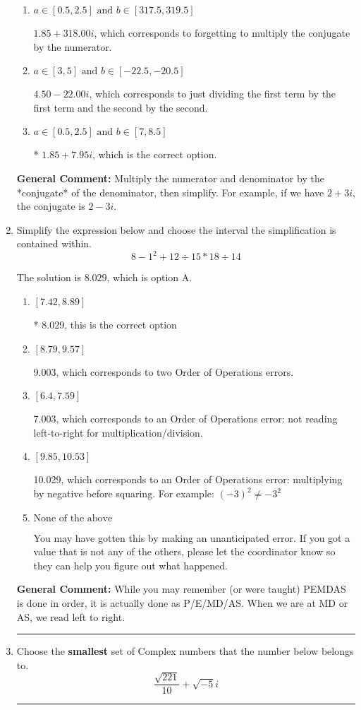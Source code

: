 \documentclass{extbook}[14pt]
\newcommand{\litem}[1]{\item #1

\rule{\textwidth}{0.4pt}}
\begin{document}
\begin{enumerate}
{\begin{enumerate}[label=\Alph*.]
 $6.25  + 5.25 i$, which corresponds to forgetting to multiply the conjugate by the numerator and not computing the conjugate correctly.
\item \( a \in [0.5, 2.5] \text{ and } b \in [317.5, 319.5] \)

 $1.85  + 318.00 i$, which corresponds to forgetting to multiply the conjugate by the numerator.
\item \( a \in [3, 5] \text{ and } b \in [-22.5, -20.5] \)

 $4.50  - 22.00 i$, which corresponds to just dividing the first term by the first term and the second by the second.
\item \( a \in [0.5, 2.5] \text{ and } b \in [7, 8.5] \)

* $1.85  + 7.95 i$, which is the correct option.
\end{enumerate}

\textbf{General Comment:} Multiply the numerator and denominator by the *conjugate* of the denominator, then simplify. For example, if we have $2+3i$, the conjugate is $2-3i$.
}
\litem{
Simplify the expression below and choose the interval the simplification is contained within.
\[ 8 - 1^2 + 12 \div 15 * 18 \div 14 \]

The solution is \( 8.029 \), which is option A.\begin{enumerate}[label=\Alph*.]
\item \( [7.42, 8.89] \)

* 8.029, this is the correct option
\item \( [8.79, 9.57] \)

 9.003, which corresponds to two Order of Operations errors.
\item \( [6.4, 7.59] \)

 7.003, which corresponds to an Order of Operations error: not reading left-to-right for multiplication/division.
\item \( [9.85, 10.53] \)

 10.029, which corresponds to an Order of Operations error: multiplying by negative before squaring. For example: $(-3)^2 \neq -3^2$
\item \( \text{None of the above} \)

 You may have gotten this by making an unanticipated error. If you got a value that is not any of the others, please let the coordinator know so they can help you figure out what happened.
\end{enumerate}

\textbf{General Comment:} While you may remember (or were taught) PEMDAS is done in order, it is actually done as P/E/MD/AS. When we are at MD or AS, we read left to right.
}
\litem{
Choose the \textbf{smallest} set of Complex numbers that the number below belongs to.
\[ \frac{\sqrt{221}}{10}+\sqrt{-5}i \]

}
\end{enumerate}
\end{document}

